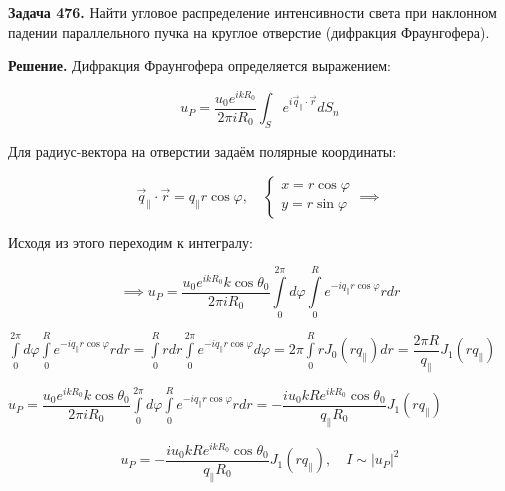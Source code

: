 \documentclass[a4paper,12pt]{article}
\begin{document}
	\quad \textbf{Задача 476.} Найти угловое распределение интенсивности света при наклонном падении параллельного пучка на круглое отверстие (дифракция Фраунгофера).
	
	\quad \textbf{Решение.} Дифракция Фраунгофера определяется выражением: 
	
	\begin{equation}
		u_P = \dfrac{u_0 e^{ikR_0}}{2\pi i R_0} \displaystyle\int_{S} e^{i\vec{q}_{\parallel} \cdot \vec{r}} dS_n
	\end{equation}
	
	\quad Для радиус-вектора на отверстии задаём полярные координаты:
	
	\begin{equation}
		\vec{q}_{\parallel} \cdot \vec{r} = q_{\parallel} r \cos\varphi, \quad \begin{cases}
			x = r\cos\varphi \\
			y = r\sin\varphi 
		\end{cases} \implies
	\end{equation}
	
	\quad Исходя из этого переходим к интегралу:
	
	\begin{equation}
		\implies u_P = \dfrac{u_0 e^{ikR_0}k\cos\theta_0}{2\pi i R_0}\displaystyle\int\limits_{0}^{2\pi} d\varphi \displaystyle\int\limits_{0}^{R} e^{-iq_{\parallel} r \cos\varphi} r dr 
	\end{equation}
	
	\begin{center}
		$\displaystyle\int\limits_{0}^{2\pi} d\varphi \displaystyle\int\limits_{0}^{R} e^{-iq_{\parallel} r \cos\varphi} r dr = \displaystyle\int\limits_{0}^{R} rdr \displaystyle\int\limits_{0}^{2\pi} e^{-iq_{\parallel}r\cos\varphi} d\varphi = 2\pi\displaystyle\int\limits_{0}^{R} rJ_0(rq_{\parallel})  dr = \dfrac{2\pi R}{q_{\parallel}}J_1 (rq_{\parallel}) $
		
		$u_P = \dfrac{u_0 e^{ikR_0}k\cos\theta_0}{2\pi i R_0}\displaystyle\int\limits_{0}^{2\pi} d\varphi \displaystyle\int\limits_{0}^{R} e^{-iq_{\parallel} r \cos\varphi} r dr  = -\dfrac{iu_0 k Re^{ikR_0}\cos\theta_0}{q_{\parallel}R_0 } J_1(rq_{\parallel})$
	\end{center}
	
	\begin{equation}
		u_P =  -\dfrac{iu_0 k Re^{ikR_0}\cos\theta_0}{q_{\parallel}R_0 } J_1(rq_{\parallel}), \quad I \sim |u_P|^2
	\end{equation}
	
\end{document}
